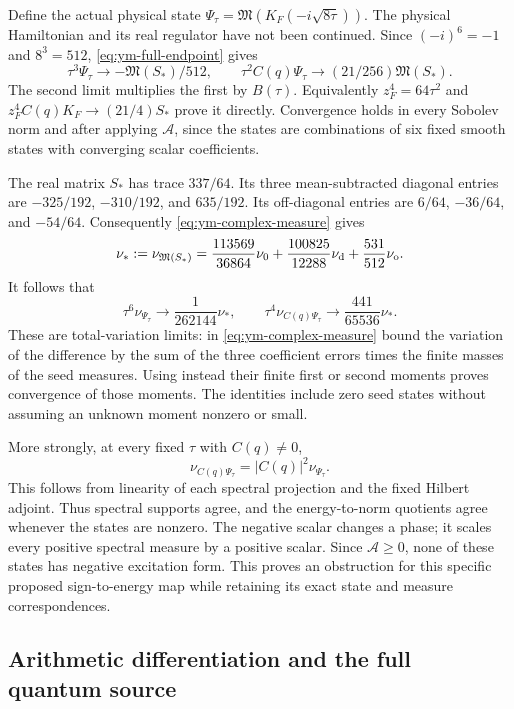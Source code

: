 Define the actual physical state
$\Psi_\tau=\mathfrak M(K_F(-i\sqrt{8\tau}))$.
The physical Hamiltonian and its real regulator have not been
continued. Since $(-i)^6=-1$ and $8^3=512$,
\eqref{eq:ym-full-endpoint} gives
\begin{equation}\label{eq:ym-state-limits}
 \tau^3\Psi_\tau\longrightarrow-\mathfrak M(S_*)/512,
 \qquad
 \tau^2C(q)\Psi_\tau\longrightarrow(21/256)\mathfrak M(S_*) .
\end{equation}
The second limit multiplies the first by $B(\tau)$.
Equivalently $z_F^4=64\tau^2$ and
$z_F^4 C(q)K_F\to(21/4)S_*$ prove it directly.
Convergence holds in every Sobolev norm and after applying
$\mathcal A$, since the states are combinations of six fixed
smooth states with converging scalar coefficients.

The real matrix $S_*$ has trace $337/64$. Its three mean-subtracted
diagonal entries are $-325/192$, $-310/192$, and $635/192$.
Its off-diagonal entries are $6/64$, $-36/64$, and $-54/64$.
Consequently \eqref{eq:ym-complex-measure} gives
\[
 \nu_*:=\nu_{\mathfrak M(S_*)}
 =\frac{113569}{36864}\nu_0
  +\frac{100825}{12288}\nu_{\rm d}
  +\frac{531}{512}\nu_{\rm o}.
\]
It follows that
\begin{equation}\label{eq:ym-spectral-limits}
 \tau^6\nu_{\Psi_\tau}\longrightarrow\frac1{262144}\nu_*,
 \qquad
 \tau^4\nu_{C(q)\Psi_\tau}\longrightarrow\frac{441}{65536}\nu_* .
\end{equation}
These are total-variation limits: in
\eqref{eq:ym-complex-measure} bound the variation of the difference
by the sum of the three coefficient errors times the finite masses
of the seed measures. Using instead their finite first or second
moments proves convergence of those moments. The identities
include zero seed states without assuming an unknown moment
nonzero or small.

More strongly, at every fixed $\tau$ with $C(q)\ne0$,
\[
 \nu_{C(q)\Psi_\tau}=|C(q)|^2\nu_{\Psi_\tau}.
\]
This follows from linearity of each spectral projection and the
fixed Hilbert adjoint. Thus spectral supports agree, and the
energy-to-norm quotients agree whenever the states are nonzero.
The negative scalar changes a phase; it scales every positive
spectral measure by a positive scalar. Since $\mathcal A\ge0$,
none of these states has negative excitation form. This proves
an obstruction for this specific proposed sign-to-energy map
while retaining its exact state and measure correspondences.

\subsection{Arithmetic differentiation and the full quantum source}

